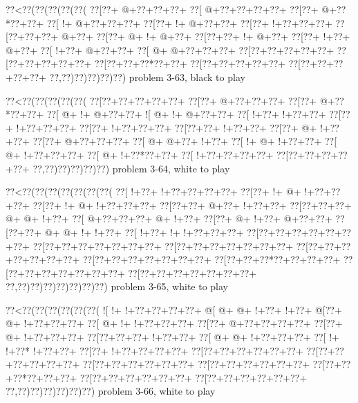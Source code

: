 \vbox{\vbox{\goo
\0??<\0??(\0??(\0??(\0??(\0??(
\0??[\0??+\- @+\0??+\0??+\0??+
\0??[\- @+\0??+\0??+\0??+\0??+
\0??[\0??+\- @+\0??*\0??+\0??+
\0??[\- !+\- @+\0??+\0??+\0??+
\0??[\0??+\- !+\- @+\0??+\0??+
\0??[\0??+\- !+\0??+\0??+\0??+
\0??[\0??+\0??+\0??+\- @+\0??+
\0??[\0??+\- @+\- !+\- @+\0??+
\0??[\0??+\0??+\- !+\- @+\0??+
\0??[\0??+\- !+\0??+\- @+\0??+
\0??[\- !+\0??+\- @+\0??+\0??+
\0??[\- @+\- @+\0??+\0??+\0??+
\0??[\0??+\0??+\0??+\0??+\0??+
\0??[\0??+\0??+\0??+\0??+\0??+
\0??[\0??+\0??+\0??*\0??+\0??+
\0??[\0??+\0??+\0??+\0??+\0??+
\0??[\0??+\0??+\0??+\0??+\0??+
\0??,\0??)\0??)\0??)\0??)\0??)
}
\hfil problem 3-63, black to play\hfil\break
}

\vbox{\vbox{\goo
\0??<\0??(\0??(\0??(\0??(\0??(
\0??[\0??+\0??+\0??+\0??+\0??+
\0??[\0??+\- @+\0??+\0??+\0??+
\0??[\0??+\- @+\0??*\0??+\0??+
\0??[\- @+\- !+\- @+\0??+\0??+
\- ![\- @+\- !+\- @+\0??+\0??+
\0??[\- !+\0??+\- !+\0??+\0??+
\0??[\0??+\- !+\0??+\0??+\0??+
\0??[\0??+\- !+\0??+\0??+\0??+
\0??[\0??+\0??+\- !+\0??+\0??+
\0??[\0??+\- @+\- !+\0??+\0??+
\0??[\0??+\- @+\0??+\0??+\0??+
\0??[\- @+\- @+\0??+\- !+\0??+
\0??[\- !+\- @+\- !+\0??+\0??+
\0??[\- @+\- !+\0??+\0??+\0??+
\0??[\- @+\- !+\0??*\0??+\0??+
\0??[\- !+\0??+\0??+\0??+\0??+
\0??[\0??+\0??+\0??+\0??+\0??+
\0??,\0??)\0??)\0??)\0??)\0??)
}
\hfil problem 3-64, white to play\hfil\break
}

\vbox{\vbox{\goo
\0??<\0??(\0??(\0??(\0??(\0??(\0??(\0??(
\0??[\- !+\0??+\- !+\0??+\0??+\0??+\0??+
\0??[\0??+\- !+\- @+\- !+\0??+\0??+\0??+
\0??[\0??+\- !+\- @+\- !+\0??+\0??+\0??+
\0??[\0??+\0??+\- @+\0??+\- !+\0??+\0??+
\0??[\0??+\0??+\0??+\- @+\- @+\- !+\0??+
\0??[\- @+\0??+\0??+\0??+\- @+\- !+\0??+
\0??[\0??+\- @+\- !+\0??+\- @+\0??+\0??+
\0??[\0??+\0??+\- @+\- @+\- !+\- !+\0??+
\0??[\- !+\0??+\- !+\- !+\0??+\0??+\0??+
\0??[\0??+\0??+\0??+\0??+\0??+\0??+\0??+
\0??[\0??+\0??+\0??+\0??+\0??+\0??+\0??+
\0??[\0??+\0??+\0??+\0??+\0??+\0??+\0??+
\0??[\0??+\0??+\0??+\0??+\0??+\0??+\0??+
\0??[\0??+\0??+\0??+\0??+\0??+\0??+\0??+
\0??[\0??+\0??+\0??*\0??+\0??+\0??+\0??+
\0??[\0??+\0??+\0??+\0??+\0??+\0??+\0??+
\0??[\0??+\0??+\0??+\0??+\0??+\0??+\0??+
\0??,\0??)\0??)\0??)\0??)\0??)\0??)\0??)
}
\hfil problem 3-65, white to play\hfil\break
}

\vbox{\vbox{\goo
\0??<\0??(\0??(\0??(\0??(\0??(\0??(
\- ![\- !+\- !+\0??+\0??+\0??+\0??+
\- @[\- @+\- @+\- !+\0??+\- !+\0??+
\- @[\0??+\- @+\- !+\0??+\0??+\0??+
\0??[\- @+\- !+\- !+\0??+\0??+\0??+
\0??[\0??+\- @+\0??+\0??+\0??+\0??+
\0??[\0??+\- @+\- !+\0??+\0??+\0??+
\0??[\0??+\0??+\0??+\- !+\0??+\0??+
\0??[\- @+\- @+\- !+\0??+\0??+\0??+
\0??[\- !+\- !+\0??*\- !+\0??+\0??+
\0??[\0??+\- !+\0??+\0??+\0??+\0??+
\0??[\0??+\0??+\0??+\0??+\0??+\0??+
\0??[\0??+\0??+\0??+\0??+\0??+\0??+
\0??[\0??+\0??+\0??+\0??+\0??+\0??+
\0??[\0??+\0??+\0??+\0??+\0??+\0??+
\0??[\0??+\0??+\0??*\0??+\0??+\0??+
\0??[\0??+\0??+\0??+\0??+\0??+\0??+
\0??[\0??+\0??+\0??+\0??+\0??+\0??+
\0??,\0??)\0??)\0??)\0??)\0??)\0??)
}
\hfil problem 3-66, white to play\hfil\break
}

